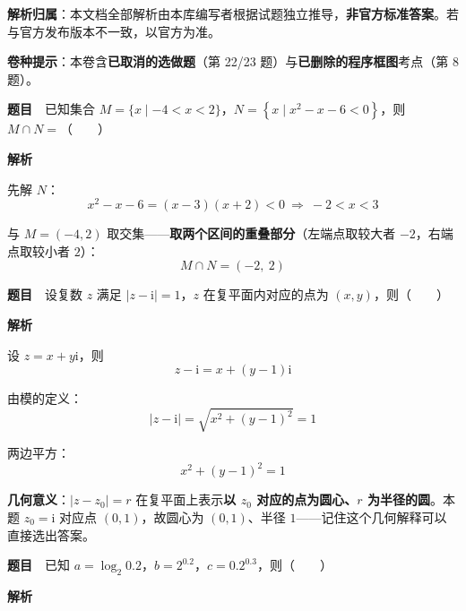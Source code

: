 

\begin{gknotice}
\textbf{解析归属}：本文档全部解析由本库编写者根据试题独立推导，\textbf{非官方标准答案}。若与官方发布版本不一致，以官方为准。

\textbf{ 卷种提示}：本卷含\textbf{已取消的选做题}（第 22/23 题）与\textbf{已删除的程序框图}考点（第 8 题）。
\end{gknotice}

\par\medskip



\textbf{题目}　已知集合 $M=\{x\mid-4<x<2\}$，$N=\left\{x\mid x^{2}-x-6<0\right\}$，则 $M\cap N=$（　　）

\textbf{解析}

先解 $N$：
\[x^{2}-x-6=(x-3)(x+2)<0\ \Longrightarrow\ -2<x<3\]

与 $M=(-4,2)$ 取交集——\textbf{取两个区间的重叠部分}（左端点取较大者 $-2$，右端点取较小者 $2$）：
\[M\cap N=(-2,\ 2)\]


\par\medskip


\textbf{题目}　设复数 $z$ 满足 $|z-\mathrm i|=1$，$z$ 在复平面内对应的点为 $(x,y)$，则（　　）

\textbf{解析}

设 $z=x+y\mathrm i$，则
\[z-\mathrm i=x+(y-1)\mathrm i\]

由模的定义：
\[|z-\mathrm i|=\sqrt{x^{2}+(y-1)^{2}}=1\]

两边平方：
\[x^{2}+(y-1)^{2}=1\]


\begin{gktip}
\textbf{几何意义}：$|z-z_0|=r$ 在复平面上表示\textbf{以 $z_0$ 对应的点为圆心、$r$ 为半径的圆}。本题 $z_0=\mathrm i$ 对应点 $(0,1)$，故圆心为 $(0,1)$、半径 $1$——记住这个几何解释可以直接选出答案。
\end{gktip}

\par\medskip


\textbf{题目}　已知 $a=\log_2 0.2$，$b=2^{0.2}$，$c=0.2^{0.3}$，则（　　）

\textbf{解析}

